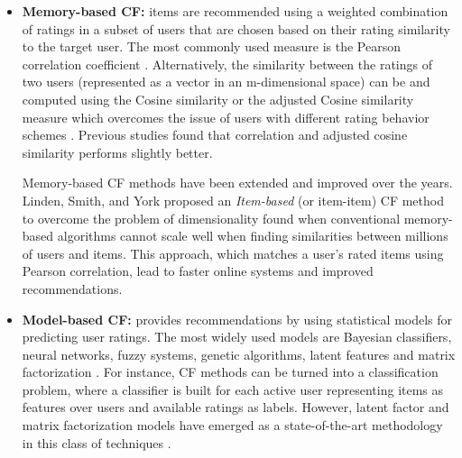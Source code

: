 \begin{itemize}
\item \textbf{Memory-based CF:} items are recommended using a weighted combination of ratings in a subset of users that are chosen based on their rating similarity to the target user. The most commonly used measure is the Pearson correlation coefficient \cite{resnick1994grouplens}.
Alternatively, the similarity between the ratings of two users (represented as a vector in an m-dimensional space) can be and computed using the Cosine similarity or the adjusted Cosine similarity measure which overcomes the issue of users with different rating behavior schemes \cite{yildirim2008random}. Previous studies found that correlation \cite{breese1998empirical} and adjusted cosine similarity \cite{yildirim2008random} performs slightly better.

Memory-based CF methods have been extended and improved over the years. Linden, Smith, and York \cite{linden2003amazon} proposed an \textit{Item-based} (or item-item) CF method to overcome the problem of dimensionality found when conventional memory-based algorithms cannot scale well when finding similarities between millions of users and items. This approach, which matches a user's rated items using Pearson correlation, lead to faster online systems and improved recommendations.

\item \textbf{Model-based CF:} provides recommendations by using statistical models for predicting user ratings. The most widely used models are Bayesian classifiers, neural networks, fuzzy systems, genetic algorithms, latent features and matrix factorization \cite{bobadilla2013recommender}. For instance, CF methods can be turned into a classification problem, where a classifier is built for each active user representing items as features over users and available ratings as labels. However, latent factor and matrix factorization models have emerged as a state-of-the-art methodology in this class of techniques \cite{koren2009matrix}.

\end{itemize}

